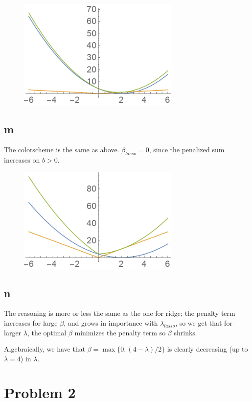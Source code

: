 \documentclass[12pt,letterpaper]{article}
\theoremstyle{definition}
\begin{document}
\begin{figure}[H]
  \centering
  \includegraphics[width=8cm]{plot5.png}
\end{figure}

\subsection*{m}

The colorscheme is the same as above. $\beta_{lasso} = 0$, since the penalized sum increases on $b > 0$.

\begin{figure}[H]
  \centering
  \includegraphics[width=8cm]{plot6.png}
\end{figure}

\subsection*{n}

The reasoning is more or less the same as the one for ridge; the penalty term increases for large $\beta$, and grows in importance with $\lambda_{lasso}$, so we get that for larger $\lambda$, the optimal $\beta$ minimizes the penalty term so $\beta$ shrinks.

Algebraically, we have that $\beta = \max\{0, (4 - \lambda)/2\}$ is clearly decreasing (up to $\lambda = 4$) in $\lambda$.

\section*{Problem 2}
\end{document}
